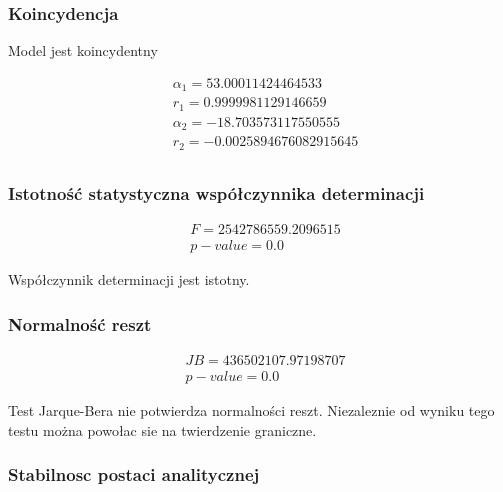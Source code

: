\subsubsection{Koincydencja}\label{koincydencja}

Model jest koincydentny


\begin{equation}
    \begin{split}
        &\alpha_1= 53.00011424464533  \\ &r_1 = 0.9999981129146659  \\
        &\alpha_2= -18.703573117550555  \\ &r_2 = -0.0025894676082915645  \\
    \end{split}
\end{equation}


\subsubsection{Istotność statystyczna współczynnika determinacji}\label{istotnosc-statystyczna-wspolczynnika-determinacji}

\begin{equation}
    \begin{split}
        &F= 2542786559.2096515 \\  &p-value = 0.0
    \end{split}
\end{equation}

Współczynnik determinacji jest istotny.

\subsubsection{Normalność reszt}\label{normalnosc-reszt}

\begin{equation}
    \begin{split}
        &JB=436502107.97198707 \\ &p-value = 0.0
    \end{split}
\end{equation}

Test Jarque-Bera nie potwierdza normalności reszt.
Niezaleznie od wyniku tego testu można powołac sie na twierdzenie graniczne.


\subsubsection{Stabilnosc postaci analitycznej}\label{stabilnosc-postaci-analitycznej}

